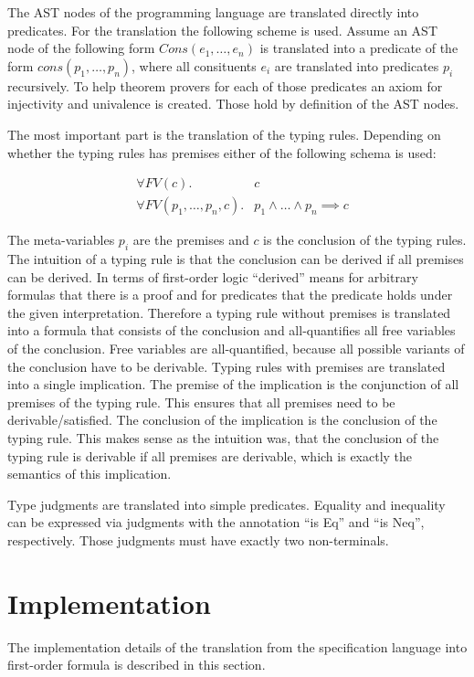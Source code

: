 The AST nodes of the programming language are translated directly into
predicates. For the translation the following scheme is used. Assume
an AST node of the following form $Cons(e_1, \dots, e_n)$ is
translated into a predicate of the form $cons(p_1, \dots, p_n)$, where
all consituents $e_i$ are translated into predicates $p_i$
recursively. To help theorem provers for each of those predicates an
axiom for injectivity and univalence is created. Those hold by
definition of the AST nodes.

The most important part is the translation of the typing
rules. Depending on whether the typing rules has premises either of
the following schema is used:

\begin{figure}
\label{formula:typing-rule}
\begin{align}
  &\forall FV(c) .& c \\
  &\forall FV(p_1,\dots, p_n, c) .& p_1 \land \dots \land p_n \implies c
\end{align}
\end{figure}

The meta-variables $p_i$ are the premises and $c$ is the conclusion of
the typing rules. The intuition of a typing rule is that the
conclusion can be derived if all premises can be derived. In terms of
first-order logic ``derived'' means for arbitrary formulas that there
is a proof and for predicates that the predicate holds under the given
interpretation. Therefore a typing rule without premises is translated
into a formula that consists of the conclusion and all-quantifies all
free variables of the conclusion. Free variables are all-quantified,
because all possible variants of the conclusion have to be derivable.
Typing rules with premises are translated into a single
implication. The premise of the implication is the conjunction of all
premises of the typing rule. This ensures that all premises need to be
derivable/satisfied. The conclusion of the implication is the
conclusion of the typing rule. This makes sense as the intuition was,
that the conclusion of the typing rule is derivable if all premises
are derivable, which is exactly the semantics of this implication.

Type judgments are translated into simple predicates. Equality and
inequality can be expressed via judgments with the annotation ``is
Eq'' and ``is Neq'', respectively. Those judgments must have exactly
two non-terminals.
\section{Implementation}
\label{sec:implementation-fof}
The implementation details of the translation from the specification
language into first-order formula is described in this section.

